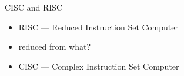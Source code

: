 \begin{frame}[label=CISCandRISC]{CISC and RISC}
    \begin{itemize}
        \item RISC --- Reduced Instruction Set Computer
        \item reduced from what?
        \vspace{.5cm}
        \item<2-> CISC --- Complex Instruction Set Computer
    \end{itemize}
\end{frame}

